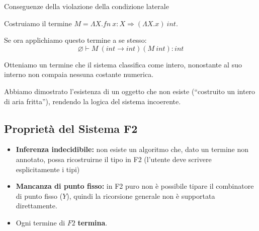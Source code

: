 \documentclass[a4paper,11pt]{report}
\begin{document}
\begin{gframe}{Conseguenze della violazione della condizione laterale}{}
\begin{itemize}
    Costruiamo il termine \(  M = \Lambda X. fn \ x : X \Rightarrow (\Lambda X.x)\ int \).
    \begin{center}
    \begin{prooftree}
    \end{prooftree}
\end{center}
    
    Se ora applichiamo questo termine a se stesso:
    \[ \varnothing \vdash M\ (int \to int)(M\ int) : int \]
    \vspace{-4em}
    \begin{center}
    \begin{prooftree}
        
        
    \end{prooftree}
    \end{center}

    Otteniamo un termine che il sistema classifica come intero, nonostante al suo interno non compaia nessuna costante numerica. 

    Abbiamo dimostrato l'esistenza di un oggetto che non esiste (``costruito un intero di aria fritta''), rendendo la logica del sistema incoerente.
    \end{itemize}
\end{gframe}


\subsection{Proprietà del Sistema F2}
\begin{itemize}
    \item \textbf{Inferenza indecidibile:} non esiste un algoritmo che, dato un termine non annotato, possa ricostruirne il tipo in F2 (l'utente deve scrivere esplicitamente i tipi)
    \item \textbf{Mancanza di punto fisso:} in F2 puro non è possibile tipare il combinatore di punto fisso ($Y$), quindi la ricorsione generale non è supportata direttamente.
\item Ogni termine di \( F2 \) \textbf{termina}.
\end{itemize}
\end{document}
